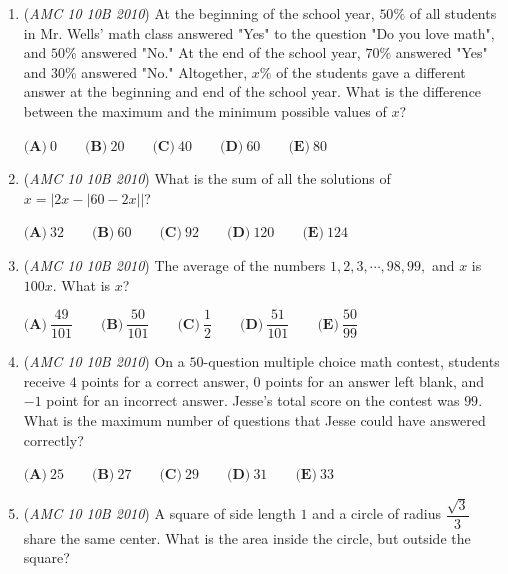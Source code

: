 \begin{enumerate}
Let $x$ and $y$ be the smallest and largest prices, respectively, for which Coupon A saves at least as many dollars as Coupon B or Coupon C. What is $y - x$?


 $\textbf{(A)}\ 50 \qquad \textbf{(B)}\ 60 \qquad \textbf{(C)}\ 75 \qquad \textbf{(D)}\ 80  \qquad \textbf{(E)}\ 100$


	\item (\textit{AMC 10 10B 2010}) At the beginning of the school year, $50\%$ of all students in Mr. Wells' math class answered "Yes" to the question "Do you love math", and $50\%$ answered "No." At the end of the school year, $70\%$ answered "Yes" and $30\%$ answered "No." Altogether, $x\%$ of the students gave a different answer at the beginning and end of the school year. What is the difference between the maximum and the minimum possible values of $x$?


 $\textbf{(A)}\ 0 \qquad \textbf{(B)}\ 20 \qquad \textbf{(C)}\ 40 \qquad \textbf{(D)}\ 60 \qquad \textbf{(E)}\ 80$


	\item (\textit{AMC 10 10B 2010}) What is the sum of all the solutions of $x = \left|2x-|60-2x|\right|$?


 $\textbf{(A)}\ 32 \qquad \textbf{(B)}\ 60 \qquad \textbf{(C)}\ 92 \qquad \textbf{(D)}\ 120 \qquad \textbf{(E)}\ 124$


	\item (\textit{AMC 10 10B 2010}) The average of the numbers $1, 2, 3,\cdots, 98, 99,$ and $x$ is $100x$. What is $x$?


 $\textbf{(A)}\ \dfrac{49}{101} \qquad \textbf{(B)}\ \dfrac{50}{101} \qquad \textbf{(C)}\ \dfrac{1}{2} \qquad \textbf{(D)}\ \dfrac{51}{101} \qquad \textbf{(E)}\ \dfrac{50}{99}$


	\item (\textit{AMC 10 10B 2010}) On a $50$-question multiple choice math contest, students receive $4$ points for a correct answer, $0$ points for an answer left blank, and $-1$ point for an incorrect answer. Jesse’s total score on the contest was $99$. What is the maximum number of questions that Jesse could have answered correctly?


 $\textbf{(A)}\ 25 \qquad \textbf{(B)}\ 27 \qquad \textbf{(C)}\ 29 \qquad \textbf{(D)}\ 31 \qquad \textbf{(E)}\ 33$


	\item (\textit{AMC 10 10B 2010}) A square of side length $1$ and a circle of radius $\dfrac{\sqrt{3}}{3}$ share the same center. What is the area inside the circle, but outside the square?



\end{enumerate}
